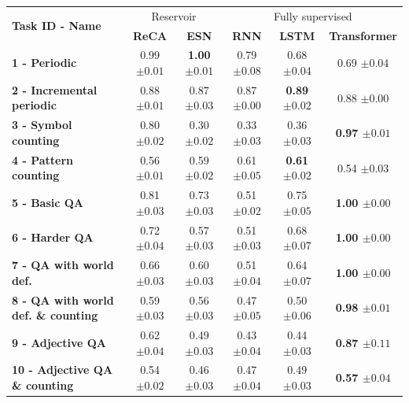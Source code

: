 {\begin{table}[htbp]
  \centering
    \begin{tabular}{lcc|ccc}
      \toprule
      \multirow{2}{*}{\bfseries Task ID - Name} & \multicolumn{2}{c|}{Reservoir} &
        \multicolumn{3}{c}{Fully supervised} \\
& \bfseries ReCA & \bfseries ESN & \bfseries RNN & \bfseries LSTM & \bfseries Transformer  \\
\midrule
\bfseries 1 - Periodic & 0.99 ${\scriptscriptstyle \pm 0.01}$ & \bfseries 1.00 ${\scriptscriptstyle \pm 0.01}$ & 0.79 ${\scriptscriptstyle \pm 0.08}$ & 0.68 ${\scriptscriptstyle \pm 0.04}$ & 0.69 ${\scriptscriptstyle \pm 0.04}$  \\
\bfseries 2 - Incremental periodic & 0.88 ${\scriptscriptstyle \pm 0.01}$ & 0.87 ${\scriptscriptstyle \pm 0.03}$ & 0.87 ${\scriptscriptstyle \pm 0.00}$ & \bfseries 0.89 ${\scriptscriptstyle \pm 0.02}$ & 0.88 ${\scriptscriptstyle \pm 0.00}$  \\
\bfseries 3 - Symbol counting & 0.80 ${\scriptscriptstyle \pm 0.02}$ & 0.30 ${\scriptscriptstyle \pm 0.02}$ & 0.33 ${\scriptscriptstyle \pm 0.03}$ & 0.36 ${\scriptscriptstyle \pm 0.03}$ & \bfseries 0.97 ${\scriptscriptstyle \pm 0.01}$  \\
\bfseries 4 - Pattern counting & 0.56 ${\scriptscriptstyle \pm 0.01}$ & 0.59 ${\scriptscriptstyle \pm 0.02}$ & 0.61 ${\scriptscriptstyle \pm 0.05}$ & \bfseries 0.61 ${\scriptscriptstyle \pm 0.02}$ & 0.54 ${\scriptscriptstyle \pm 0.03}$  \\
\bfseries 5 - Basic QA & 0.81 ${\scriptscriptstyle \pm 0.03}$ & 0.73 ${\scriptscriptstyle \pm 0.03}$ & 0.51 ${\scriptscriptstyle \pm 0.02}$ & 0.75 ${\scriptscriptstyle \pm 0.05}$ & \bfseries 1.00 ${\scriptscriptstyle \pm 0.00}$  \\
\bfseries 6 - Harder QA & 0.72 ${\scriptscriptstyle \pm 0.04}$ & 0.57 ${\scriptscriptstyle \pm 0.03}$ & 0.51 ${\scriptscriptstyle \pm 0.03}$ & 0.68 ${\scriptscriptstyle \pm 0.07}$ & \bfseries 1.00 ${\scriptscriptstyle \pm 0.00}$  \\
\bfseries 7 - QA with world def. & 0.66 ${\scriptscriptstyle \pm 0.03}$ & 0.60 ${\scriptscriptstyle \pm 0.03}$ & 0.51 ${\scriptscriptstyle \pm 0.04}$ & 0.64 ${\scriptscriptstyle \pm 0.07}$ & \bfseries 1.00 ${\scriptscriptstyle \pm 0.00}$  \\
\bfseries 8 - QA with world def. \& counting & 0.59 ${\scriptscriptstyle \pm 0.03}$ & 0.56 ${\scriptscriptstyle \pm 0.03}$ & 0.47 ${\scriptscriptstyle \pm 0.05}$ & 0.50 ${\scriptscriptstyle \pm 0.06}$ & \bfseries 0.98 ${\scriptscriptstyle \pm 0.01}$  \\
\bfseries 9 - Adjective QA & 0.62 ${\scriptscriptstyle \pm 0.04}$ & 0.49 ${\scriptscriptstyle \pm 0.03}$ & 0.43 ${\scriptscriptstyle \pm 0.04}$ & 0.44 ${\scriptscriptstyle \pm 0.03}$ & \bfseries 0.87 ${\scriptscriptstyle \pm 0.11}$  \\
\bfseries 10 - Adjective QA \& counting & 0.54 ${\scriptscriptstyle \pm 0.02}$ & 0.46 ${\scriptscriptstyle \pm 0.03}$ & 0.47 ${\scriptscriptstyle \pm 0.04}$ & 0.49 ${\scriptscriptstyle \pm 0.03}$ & \bfseries 0.57 ${\scriptscriptstyle \pm 0.04}$  \\



\end{tabular}
\end{table}}
